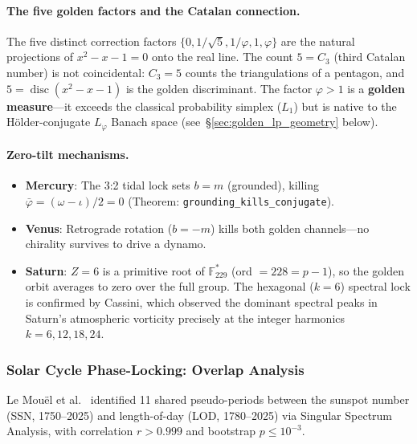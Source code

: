 \paragraph{The five golden factors and the Catalan connection.}
The five distinct correction factors $\{0, 1/\sqrt{5}, 1/\varphi, 1, \varphi\}$ are the natural projections of $x^2 - x - 1 = 0$ onto the real line. The count $5 = C_3$ (third Catalan number) is not coincidental: $C_3 = 5$ counts the triangulations of a pentagon, and $5 = \operatorname{disc}(x^2 - x - 1)$ is the golden discriminant. The factor $\varphi > 1$ is a \textbf{golden measure}---it exceeds the classical probability simplex ($L_1$) but is native to the H\"older-conjugate $L_\varphi$ Banach space (see~\S\ref{sec:golden_lp_geometry} below).

\paragraph{Zero-tilt mechanisms.}
\begin{itemize}[noitemsep]
    \item \textbf{Mercury}: The 3:2 tidal lock sets $b = m$ (grounded), killing $\bar\varphi = (\omega - \iota)/2 = 0$ (Theorem: \texttt{grounding\_kills\_conjugate}).
    \item \textbf{Venus}: Retrograde rotation ($b = -m$) kills both golden channels---no chirality survives to drive a dynamo.
    \item \textbf{Saturn}: $Z = 6$ is a primitive root of $\mathbb{F}_{229}^*$ (ord $= 228 = p-1$), so the golden orbit averages to zero over the full group. The hexagonal ($k = 6$) spectral lock is confirmed by Cassini, which observed the dominant spectral peaks in Saturn's atmospheric vorticity precisely at the integer harmonics $k = 6, 12, 18, 24$.
\end{itemize}

\subsubsection{Solar Cycle Phase-Locking: Overlap Analysis}

Le Mou\"el et al.~\cite{lemouël2025ext} identified 11 shared pseudo-periods between the sunspot number (SSN, 1750--2025) and length-of-day (LOD, 1780--2025) via Singular Spectrum Analysis, with correlation $r > 0.999$ and bootstrap $p \leq 10^{-3}$.

